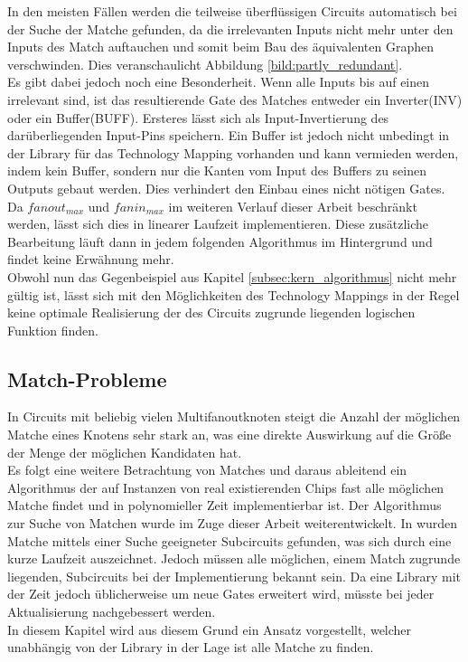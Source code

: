 \documentclass[11pt, a4paper, german]{article}
\newcommand{\TM}{Technology  Mapping }
\begin{document}
In den meisten Fällen werden die teilweise überflüssigen Circuits automatisch bei der  Suche der Matche gefunden, da die irrelevanten Inputs nicht mehr unter den Inputs des Match auftauchen und somit beim Bau des äquivalenten Graphen verschwinden. Dies veranschaulicht Abbildung \ref{bild:partly_redundant}. \\
Es gibt dabei jedoch noch eine Besonderheit. Wenn alle Inputs bis auf einen irrelevant sind, ist das resultierende Gate des Matches entweder ein Inverter(INV) oder ein Buffer(BUFF). Ersteres lässt sich als Input-Invertierung des darüberliegenden Input-Pins speichern. Ein Buffer ist jedoch nicht unbedingt in der Library für das \TM vorhanden und kann vermieden werden, indem kein Buffer, sondern nur die Kanten vom Input des Buffers zu seinen Outputs gebaut werden. Dies verhindert den Einbau eines nicht nötigen Gates. Da $fanout_{max}$ und $fanin_{max}$ im weiteren Verlauf dieser Arbeit beschränkt werden, lässt sich dies in linearer Laufzeit implementieren. Diese zusätzliche Bearbeitung läuft dann in jedem folgenden Algorithmus im Hintergrund und findet keine Erwähnung mehr.\\
 Obwohl nun das Gegenbeispiel aus Kapitel \ref{subsec:kern_algorithmus} nicht mehr gültig ist, lässt sich mit den Möglichkeiten des Technology Mappings in der Regel keine optimale Realisierung der des Circuits zugrunde liegenden logischen Funktion finden.
 
 
\subsection{Match-Probleme}
\label{subsec:match_kandidaten}
In Circuits mit beliebig vielen Multifanoutknoten steigt die Anzahl der möglichen Matche eines Knotens sehr stark an, was eine direkte Auswirkung auf die Größe der Menge der möglichen Kandidaten hat. \\
Es folgt eine weitere Betrachtung von Matches und daraus ableitend ein Algorithmus der auf Instanzen von real existierenden Chips fast alle möglichen Matche findet und in polynomieller Zeit implementierbar ist. Der Algorithmus zur Suche von Matchen wurde im Zuge dieser Arbeit weiterentwickelt. In \cite{Elbert} wurden Matche mittels einer Suche geeigneter Subcircuits gefunden, was sich durch eine kurze Laufzeit auszeichnet. Jedoch müssen alle möglichen, einem Match zugrunde liegenden,  Subcircuits bei der Implementierung bekannt sein. Da eine Library mit der Zeit jedoch üblicherweise um neue Gates erweitert wird, müsste bei jeder Aktualisierung nachgebessert werden.\\ 
In diesem Kapitel wird aus diesem Grund ein Ansatz vorgestellt, welcher unabhängig von der Library in der Lage ist alle Matche zu finden. 
\end{document}
